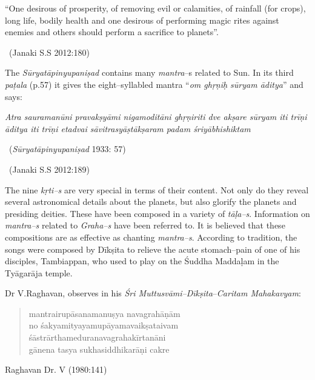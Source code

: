 \begin{myquote}
“One desirous of prosperity, of removing evil or calamities, of rainfall (for crops), long life, bodily health and one desirous of performing magic rites against enemies and others should perform a sacrifice to planets”.
\end{myquote}


~\hfill (Janaki S.S 2012:180)

The \textit{Sūryatāpinyupaniṣad} contains many \textit{mantra}–s related to Sun. In its third \textit{paṭala} (p.57) it gives the eight–syllabled mantra “\textit{om ghṛṇiḥ sūryam āditya}” and says:

\begin{myquote}
\textit{Atra sauramanūni pravakṣyāmi nigamoditāni  ghṛṇiriti dve akṣare  sūryam iti trīṇi  āditya iti trīṇi  etadvai sāvitrasyāṣtākṣaram padam śriyābhishiktam }
\end{myquote}


~\hfill (\textit{Sūryatāpinyupaniṣad} 1933: 57)

~\hfill (Janaki S.S 2012:189)

The nine \textit{kṛti–s} are very special in terms of their content. Not only do they reveal several astronomical details about the planets, but also glorify the planets and presiding deities. These have been composed in a variety of \textit{tāḷa–s}. Information on \textit{mantra–s} related to \textit{Graha–s} have been referred to. It is believed that these compositions are as effective as chanting \textit{mantra–s}. According to tradition, the songs were composed by Dīkṣita to relieve the acute stomach–pain of one of his disciples, Tambiappan, who used to play on the Śuddha Maddaḷam in the Tyāgarāja temple.

Dr V.Raghavan, observes in his \textit{Śri Muttusvāmi–Dīkṣita}–\textit{Caritam Maha\-kavyam}:

\vspace{-.3cm}

\begin{verse}
mantrairupāsanamanuṣya navagrahāṇām\\ no śakyamityayamupāyamavaikṣataivam \\ śāstrārthameduranavagrahakīrtanāni\\ gānena tasya sukhasiddhikarāṇi cakre 
\end{verse}

\begin{flushright}
Raghavan Dr. V (1980:141)
\end{flushright}

